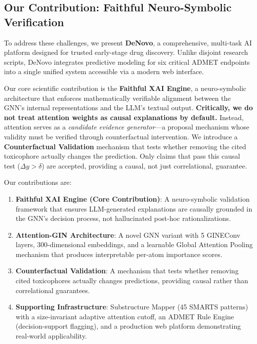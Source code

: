 \documentclass[conference]{IEEEtran}
\begin{document}
\subsection{Our Contribution: Faithful Neuro-Symbolic Verification}

To address these challenges, we present \textbf{DeNovo}, a comprehensive, multi-task AI platform designed for trusted early-stage drug discovery. Unlike disjoint research scripts, DeNovo integrates predictive modeling for six critical ADMET endpoints into a single unified system accessible via a modern web interface.

Our core scientific contribution is the \textbf{Faithful XAI Engine}, a neuro-symbolic architecture that enforces mathematically verifiable alignment between the GNN's internal representations and the LLM's textual output. \textbf{Critically, we do not treat attention weights as causal explanations by default.} Instead, attention serves as a \textit{candidate evidence generator}---a proposal mechanism whose validity must be verified through counterfactual intervention. We introduce a \textbf{Counterfactual Validation} mechanism that tests whether removing the cited toxicophore actually changes the prediction. Only claims that pass this causal test ($\Delta y > \delta$) are accepted, providing a causal, not just correlational, guarantee.

Our contributions are:
\begin{enumerate}
    \item \textbf{Faithful XAI Engine (Core Contribution)}: A neuro-symbolic validation framework that ensures LLM-generated explanations are causally grounded in the GNN's decision process, not hallucinated post-hoc rationalizations.
    \item \textbf{Attention-GIN Architecture}: A novel GNN variant with 5 GINEConv layers, 300-dimensional embeddings, and a learnable Global Attention Pooling mechanism that produces interpretable per-atom importance scores.
    \item \textbf{Counterfactual Validation}: A mechanism that tests whether removing cited toxicophores actually changes predictions, providing causal rather than correlational guarantees.
    \item \textbf{Supporting Infrastructure}: Substructure Mapper (45 SMARTS patterns) with a size-invariant adaptive attention cutoff, an ADMET Rule Engine (decision-support flagging), and a production web platform demonstrating real-world applicability.
\end{enumerate}
\end{document}
